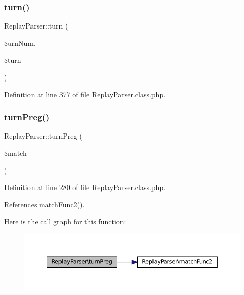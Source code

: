 \subsubsection{\texorpdfstring{turn()}{turn()}}
{\footnotesize\ttfamily Replay\+Parser\+::turn (\begin{DoxyParamCaption}\item[{}]{\$urn\+Num,  }\item[{}]{\$turn }\end{DoxyParamCaption})}



Definition at line 377 of file Replay\+Parser.\+class.\+php.

\mbox{\label{class_replay_parser_aafb3432e5c966902df375fe1614a4cae}} 
\subsubsection{\texorpdfstring{turn\+Preg()}{turnPreg()}}
{\footnotesize\ttfamily Replay\+Parser\+::turn\+Preg (\begin{DoxyParamCaption}\item[{}]{\$match }\end{DoxyParamCaption})}



Definition at line 280 of file Replay\+Parser.\+class.\+php.



References match\+Func2().

Here is the call graph for this function\+:\nopagebreak
\begin{figure}[H]
\begin{center}
\leavevmode
\includegraphics[width=350pt]{class_replay_parser_aafb3432e5c966902df375fe1614a4cae_cgraph}
\end{center}
\end{figure}
\mbox{\label{class_replay_parser_a68b9a6f8d99c70c8e6cef889ebe50e3c}} 
